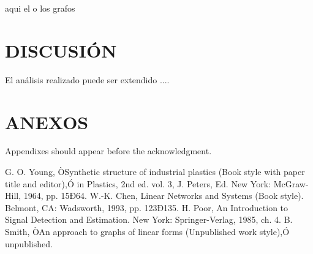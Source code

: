 \documentclass[letterpaper, 10 pt, conference]{ieeeconf}  %
\begin{document}
aqui el o los grafos



\section{DISCUSI\'ON}

El an\'alisis realizado puede ser extendido ....



\section*{ANEXOS}

Appendixes should appear before the acknowledgment.







\begin{thebibliography}{10}

 G. O. Young, ÒSynthetic structure of industrial plastics (Book style with paper title and editor),Ó 	in Plastics, 2nd ed. vol. 3, J. Peters, Ed.  New York: McGraw-Hill, 1964, pp. 15Ð64.
 W.-K. Chen, Linear Networks and Systems (Book style).	Belmont, CA: Wadsworth, 1993, pp. 123Ð135.
 H. Poor, An Introduction to Signal Detection and Estimation.   New York: Springer-Verlag, 1985, ch. 4.
 B. Smith, ÒAn approach to graphs of linear forms (Unpublished work style),Ó unpublished.

\end{thebibliography}
\end{document}

